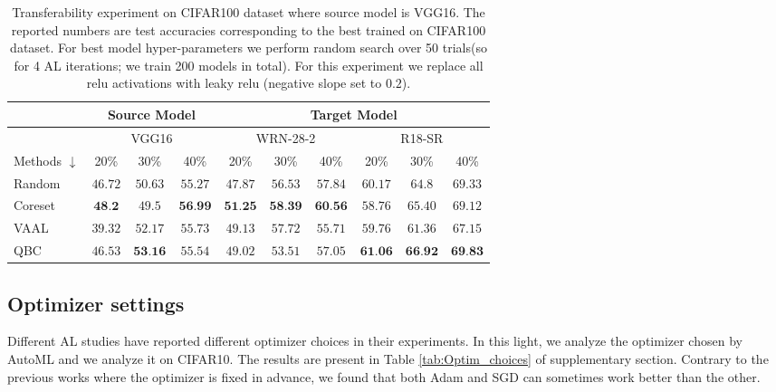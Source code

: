 \documentclass[10pt,twocolumn,letterpaper]{article}
\begin{document}
\begin{table}[ht]
\begin{center}
\begin{tabular}{l|c c c|c c c|c c c}

\toprule
        & \multicolumn{3}{c}{Source Model} & \multicolumn{6}{c}{Target Model}\\
        \midrule
& \multicolumn{3}{c|}{VGG16}  & \multicolumn{3}{c|}{WRN-28-2} & \multicolumn{3}{c}{R18-SR} \\
Methods $\downarrow$  & 20\%   & 30\%   & 40\%    & 20\%      & 30\%      & 40\%      & 20\%        & 30\%       & 40\% \\
 \midrule
Random  & $46.72$   & $50.63$   & $55.27$    & $47.87$      & $56.53$      & $57.84$     & $60.17$  & $64.8$      & $69.33$  \\
Coreset  & $\textbf{48.2}$   & $49.5$   & $\textbf{56.99}$    & $\textbf{51.25}$     & $\textbf{58.39}$     & $\textbf{60.56}$      & $58.76$       & $65.40$      & $69.12$  \\
VAAL  & $39.32$   & $52.17$   & $55.73$    & $49.13$      & $57.72$      & $55.71$      & $59.76$         & $61.36$      & $67.15$   \\
QBC  & $46.53$   & $\textbf{53.16}$   & $55.54$    & $49.02$      & $53.51$      & $57.05$      & $\textbf{61.06}$         & $\textbf{66.92}$      & $\textbf{69.83}$   \\

\bottomrule
\end{tabular}
\end{center}

\caption{Transferability experiment on CIFAR100 dataset where source model is VGG16. The reported numbers are test accuracies corresponding to the best trained on CIFAR100 dataset. For best model hyper-parameters we perform random search over 50 trials(so for 4 AL iterations; we train 200 models in total). For this experiment we replace all relu activations with leaky relu (negative slope set to $0.2$). 
}
\label{tab:cifar100_transfer_experiments}
\end{table}


\subsection{Optimizer settings}

Different AL studies have reported different optimizer choices in their experiments. In this light, we analyze the optimizer chosen by AutoML and we analyze it on CIFAR10. The results are present in Table \ref{tab:Optim_choices} of supplementary section. Contrary to the previous works where the optimizer is fixed in advance, we found that both Adam and SGD can sometimes work better than the other.
\end{document}
